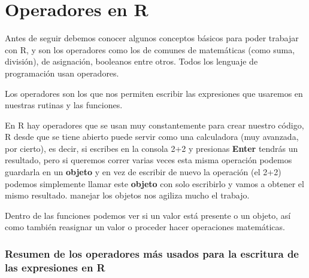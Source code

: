 \documentclass[
  letterpaper,
  DIV=11,
  numbers=noendperiod]{scrreprt}
\begin{document}

\chapter{Operadores en R}\label{operadores-en-r}

Antes de seguir debemos conocer algunos conceptos básicos para poder
trabajar con R, y son los operadores como los de comunes de matemáticas
(como suma, división), de asignación, booleanos entre otros. Todos los
lenguaje de programación usan operadores.

Los operadores son los que nos permiten escribir las expresiones que
usaremos en nuestras rutinas y las funciones.

En R hay operadores que se usan muy constantemente para crear nuestro
código, R desde que se tiene abierto puede servir como una calculadora
(muy avanzada, por cierto), es decir, si escribes en la consola 2+2 y
presionas \textbf{Enter} tendrás un resultado, pero si queremos correr
varias veces esta misma operación podemos guardarla en un
\textbf{objeto} y en vez de escribir de nuevo la operación (el 2+2)
podemos simplemente llamar este \textbf{objeto} con solo escribirlo y
vamos a obtener el mismo resultado. manejar los objetos nos agiliza
mucho el trabajo.

Dentro de las funciones podemos ver si un valor está presente o un
objeto, así como también reasignar un valor o proceder hacer operaciones
matemáticas.

\subsection{\texorpdfstring{\textbf{Resumen de los operadores más usados
para la escritura de las expresiones en
R}}{Resumen de los operadores más usados para la escritura de las expresiones en R}}\label{resumen-de-los-operadores-muxe1s-usados-para-la-escritura-de-las-expresiones-en-r}
\end{document}
